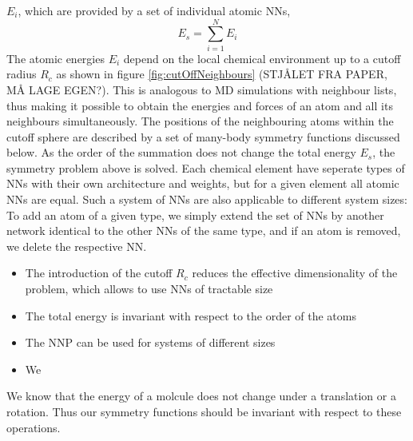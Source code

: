\documentclass[twoside,english]{uiofysmaster}
\begin{document}
$E_i$, which are provided by a set of individual atomic NNs,
\begin{equation}
 E_s = \sum_{i=1}^N E_i
 \label{systemEnergy}
\end{equation}
The atomic energies $E_i$ depend on the local chemical environment up to a cutoff radius $R_c$ as shown in figure
\ref{fig:cutOffNeighbours} (STJÅLET FRA PAPER, MÅ LAGE EGEN?). 
This is analogous to MD simulations with neighbour lists, thus making it possible to 
obtain the energies and forces of an atom and all its neighbours simultaneously. The positions of the neighbouring atoms within 
the cutoff sphere are described by a set of many-body symmetry functions discussed below. As the order of the summation does not 
change the total energy $E_s$, the symmetry problem above is solved. Each chemical element have seperate types of
NNs with their own architecture and weights, but for a given element all atomic NNs are equal. Such a system of NNs are also 
applicable to different system sizes: To add an atom of a given type, we simply extend the set of NNs by another network
identical to the other NNs of the same type, and if an atom is removed, we delete the respective NN. 
\begin{itemize}
 \item The introduction of the cutoff $R_c$ reduces the effective dimensionality
 of the problem, which allows to use NNs of tractable size
 \item The total energy is invariant with respect to the order of the atoms
 \item The NNP can be used for systems of different sizes
 \item We 
\end{itemize}
We know that the energy of a molcule does not change under a translation or a rotation. Thus our symmetry functions
should be invariant with respect to these operations. 
\end{document}
